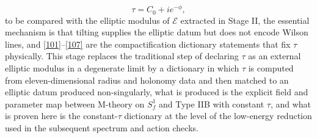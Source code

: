 \documentclass[11pt]{article}
\theoremstyle{remark}
\newcommand{\calE}{\mathcal{E}}
\begin{document}
\begin{equation}\label{107}
\tau=C_{0}+ie^{-\phi},
\end{equation}
to be compared with the elliptic modulus of \(\calE\) extracted in Stage II, the essential mechanism is that tilting supplies the elliptic datum but does not encode Wilson lines, and \eqref{101}–\eqref{107} are the compactification dictionary statements that fix \(\tau\) physically. This stage replaces the traditional step of declaring \(\tau\) as an external elliptic modulus in a degenerate limit by a dictionary in which \(\tau\) is computed from eleven-dimensional radius and holonomy data and then matched to an elliptic datum produced non-singularly, what is produced is the explicit field and parameter map between M-theory on \(S_f^1\) and Type IIB with constant \(\tau\), and what is proven here is the constant-\(\tau\) dictionary at the level of the low-energy reduction used in the subsequent spectrum and action checks.
\end{document}
